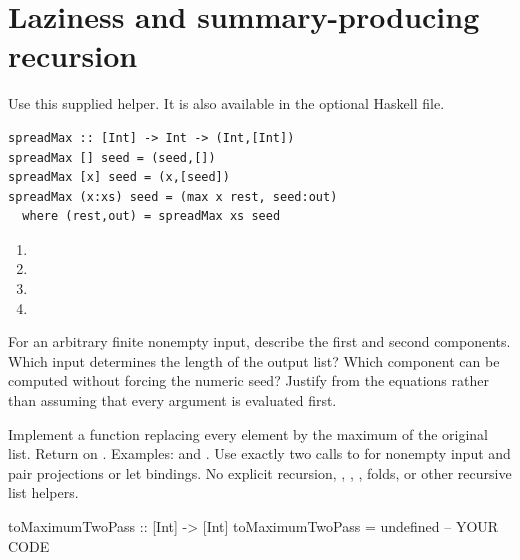 \chapter{Laziness and summary-producing recursion}
Use this supplied helper. It is also available in the optional Haskell file.
\par\noindent\begin{minipage}{\linewidth}
\begin{lstlisting}
spreadMax :: [Int] -> Int -> (Int,[Int])
spreadMax [] seed = (seed,[])
spreadMax [x] seed = (x,[seed])
spreadMax (x:xs) seed = (max x rest, seed:out)
  where (rest,out) = spreadMax xs seed
\end{lstlisting}
\end{minipage}\par

\begin{enumerate}[label=(\alph*)]
\item {}
\answer{[Result.]}
\item {}
\answer{[Result.]}
\item {}
\item {}
\end{enumerate}

For an arbitrary finite nonempty input, describe the first and second
components. Which input determines the length of the output list? Which
component can be computed without forcing the numeric seed? Justify from the
equations rather than assuming that every argument is evaluated first.

Implement a function replacing every element by the maximum of the original
list. Return \code{[]} on \code{[]}. Examples:
\code{[4,1,7] -> [7,7,7]} and \code{[-8,-3] -> [-3,-3]}.
Use exactly two calls to  for nonempty input and pair
projections or let bindings. No explicit recursion, , ,
, folds, or other recursive list helpers.
\par\noindent\begin{minipage}{\linewidth}
\begin{codeanswer}
toMaximumTwoPass :: [Int] -> [Int]
toMaximumTwoPass = undefined  -- YOUR CODE
\end{codeanswer}
\end{minipage}\par


